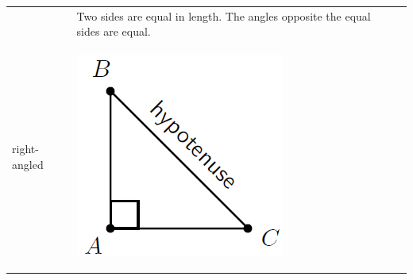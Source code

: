 \begin{center}
\begin{xtabular*}{\mytablewidth}[t]{|p{10\mystarwidth}|p{10\mystarwidth}|p{10\mystarwidth}|}
\begin{center}
    \end{center}



    \addtocounter{footnote}{-0}
    
                 &
    
    
        Two sides are equal in length. The angles opposite the equal sides are equal.%
     \tabularnewline{}
    
    
        right-angled &
    
    
        
                  
    \setcounter{subfigure}{0}

\label{m39368*id317628}
    \begin{center}
    \label{m39368*id317628!!!underscore!!!media}\label{m39368*id317628!!!underscore!!!printimage}\includegraphics[width=.2\columnwidth]{col11306.imgs/m39368_MG10C13_025.png} %
        
      \vspace{2pt}
    \vspace{.1in}
    
    \end{center}



    \addtocounter{footnote}{-0}
    
                 &
    
    

\end{xtabular*}
\end{center}
